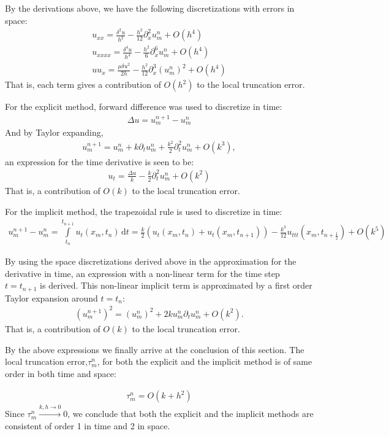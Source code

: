By the derivations above, we have the following discretizations with errors in space:
\begin{align*}
u_{xx} = \frac{\delta^2 u}{h^2} - \frac{h^2}{12}\partial_{x}^2u_m^n + O(h^4) \\
u_{xxxx} = \frac{\delta^4 u}{h^4} - \frac{h^2}{6}\partial_{x}^6u_m^n + O(h^4) \\
uu_{x} = \frac{\mu \delta u^2}{2h} - \frac{h^2}{12}\partial_{x}^3(u_m^n)^2 + O(h^4)
\end{align*}
That is, each term gives a contribution of $O(h^2)$ to the local truncation error.

For the explicit method, forward difference was used to discretize in time:
\begin{align*}
\Delta u = u_m^{n+1}-u_m^n
\end{align*}
And by Taylor expanding,
\begin{align*}
u_m^{n+1} = u_m^n + k\partial_tu_m^n + \frac{k^2}{2}\partial_t^2u_m^n + O(k^3),
\end{align*}
an expression for the time derivative is seen to be:
\begin{align*}
u_t = \frac{\Delta u}{k} - \frac{k}{2}\partial_t^2u_m^n + O(k^2)
\end{align*}
That is, a contribution of $O(k)$ to the local truncation error.

For the implicit method, the trapezoidal rule is used to discretize in time:
\begin{align*}
u_{m}^{n+1} - u_m^n = \int\limits_{t_{n}}^{t_{n+1}} u_{t}(x_{m},t_{n})\, \mathrm{d}t = \frac{k}{2}(u_t(x_m,t_n) + u_t(x_m,t_{n+1})) - \frac{k^3}{12}u_{ttt}(x_m,t_{n+\frac{1}{2}}) + O(k^5)
\end{align*}

By using the space discretizations derived above in the approximation for the derivative in time, an expression with a non-linear term for the time step $t=t_{n+1}$ is derived. This non-linear implicit term is approximated by a first order Taylor expansion around $t=t_{n}$:
\begin{align*}
(u_m^{n+1})^2 = (u_m^n)^2 + 2ku_m^n\partial_tu_m^n + O(k^2).
\end{align*}
That is, a contribution of $O(k)$ to the local truncation error.

By the above expressions we finally arrive at the conclusion of this section. The local truncation error,$\tau_m^n$, for both the explicit and the implicit method is of same order in both time and space:

\begin{align*}
\tau_m^n = O(k + h^2)
\end{align*}
Since $\tau_m^n \xrightarrow{k,h \to 0} 0$, we conclude that both the explicit and the implicit methods are consistent of order 1 in time and 2 in space.

